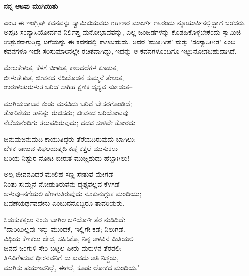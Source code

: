\begin{center}
\textbf{ನನ್ನ ಆಟವು ಮುಗಿಯಿತು}
\end{center}

 ಎಂಬ ಈ ಇಂಗ್ಲಿಷ್ ಕವನವನ್ನು ಸ್ವಾಮಿಜಿಯವರು ೧೮೯೫ರ ಮಾರ್ಚ್ ೧೬ರಂದು ನ್ಯೂಯಾರ್ಕಿನಲ್ಲಿದ್ದಾಗ ಬರೆದರು. ಅಪ್ಪಟ ಸಂನ್ಯಾಸಿಯೋರ್ವನ ನಿರ್ಲಿಪ್ತ ಮನೋಭಾವವನ್ನು, ಎಲ್ಲ ಜಂಜಡಗಳನ್ನು ಕೊಡಹಿಕೊಳ್ಳಬೇಕೆಂದು ಸ್ವಾಮಿಜಿ ಉತ್ಸುಕರಾಗುತ್ತಿದ್ದ ಬಗೆಯನ್ನು ಈ ಕವನದಲ್ಲಿ ಕಾಣಬಹುದು. ಅವರ 'ಮುಕ್ತಿಗೀತೆ' ಮತ್ತು 'ಸಂನ್ಯಾಸಿಗೀತ' ಎಂಬ ಕವನಗಳೂ ಇದೇ ಸರಿಸುಮಾರಿನಲ್ಲೇ ರಚಿತವಾಗಿದ್ದು, ಇದನ್ನು ಆ ಕವನಗಳೊಂದಿಗೂ ಇಟ್ಟುನೋಡಬಹುದಾಗಿದೆ.

\begin{myquote}
ಮೇಲಕೇಳುತ, ಕೆಳಗೆ ಬೀಳುತ, ಕಾಲದಲೆಗಳ ಕೂಡುತ,\\ಬೀಳುತೇಳುತ, ಜೀವನದ ನದಿಯೊಡನೆ ಸುಮ್ಮನೆ ತೇಲುತ,\\ಉರುಳುತುರುಳುತ ಬರಿದೆ ಸಾಗಿಹೆ ಕ್ಷಣಿಕ ದೃಶ್ಯವ ನೋಡುತ–
\end{myquote}

\begin{myquote}
ಮುಗಿಯದಾಟವ ಕಂಡು ಮನವಿದು ಬರಿದೆ ಬೇಸರಗೊಂಡಿದೆ;\\ತೋರಿಕೆಯು ತಾನಿನ್ನು ರುಚಿಸದು; ಜೀವನದ ಬರಿಯೋಟವು\\ನೆಲೆಯನೆಂದಿಗು ತಲುಪದಿರುವುದು; ದಡದ ಸುಳಿವೇ ತೋರದು!
\end{myquote}

\begin{myquote}
ಜನುಮಜನುಮದಿ ಕಾಯುತಿದ್ದರು ತೆರೆಯದಿರುವುದು ಬಾಗಿಲು;\\ಬೆಳಕ ಕಾಣುವ ವಿಫಲಯತ್ನದಿ ಕಣ್ಗೆ ಕತ್ತಲೆ ಮುಸುಕಲು\\ಬರಿಯ ನಿಷ್ಟುರ ನೋಟ ಬೀರುತ ಮುಚ್ಚಿಹುದು ಹೆಬ್ಬಾಗಿಲು!
\end{myquote}

\begin{myquote}
ಅಲ್ಪ ಜೀವನವಿದರ ಮೇಲಿಹ ಸಣ್ಣ ಸೇತುವೆ ಮೇಗಡೆ\\ನಿಂತು ಸುಮ್ಮನೆ ನೋಡುತಿರುವೆನು ದೃಶ್ಯವೆಲ್ಲವ ಕೆಳಗಡೆ\\ಅಳುವು–ನಗೆಯಲಿ ಹೆಣಗುತಿರುವುದು ನೂಕುನುಗ್ಗುತ ಮಂದಿಯು;\\ಬವಣೆಯರ್ಥವದೇನು ಎಂಬುದನೊಬ್ಬರೂ ತಾವರಿಯರು.
\end{myquote}

\begin{myquote}
ಸಿಡುಕುಕತ್ತಲು ನಿಂತು ಬಾಗಿಲ ಬಳಿಯೊಳೀ ತೆರ ನುಡಿದಿದೆ:\\"ದಾರಿಯಿಲ್ಲವು ಇನ್ನು ಮುಂದಕೆ, ಇಲ್ಲಿಗೇ ಕಡೆ; ನಿಲುಗಡೆ.\\ವಿಧಿಯ ಕೆಣಕಲು ಬೇಡ, ಸಹಿಸಿಕೊ, ನಿನ್ನ ಅಳವಿನ ಮಿತಿಯಲಿ\\ಜನದ ಜಂಗುಳಿ ಸೇರಿ ಬಟ್ಟಲ ಹೀರು ಮರುಳನ ತೆರದಲಿ;\\ತಿಳಿವಿಗೆಳಸುವ ಧೀರನವನಿಗೆ ದುಃಖವದು ಅತಿ ನಿಶ್ಚಯ,\\ಮುಗಿಸು ಪಯಣವನಿಲ್ಲೆ, ಈಗಲೆ, ಕೂಡು ಲೋಕದ ಮಂದಿಯ."
\end{myquote}

